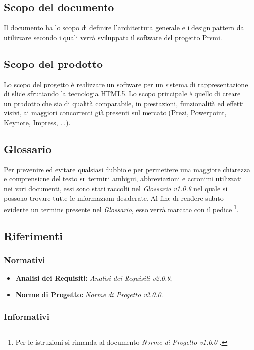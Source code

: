 \subsection{Scopo del documento}
	Il documento ha lo scopo di definire l'architettura generale e i \gls{design pattern} da utilizzare secondo i quali verrà sviluppato il software del progetto Premi.
	
\subsection{Scopo del prodotto}
Lo scopo del progetto è realizzare un software per un sistema di rappresentazione di \gls{slide} sfruttando la tecnologia  \gls{HTML5}. Lo scopo principale è quello di creare un prodotto che sia di qualità comparabile, in prestazioni, funzionalità ed effetti visivi, ai maggiori concorrenti già presenti sul mercato (Prezi, Powerpoint, Keynote, Impress, ...).

\subsection{Glossario}
Per prevenire ed evitare qualsiasi dubbio e per permettere una maggiore chiarezza e comprensione del testo su termini ambigui, abbreviazioni e acronimi utilizzati nei vari documenti, essi sono stati raccolti nel \textit{Glossario v1.0.0} nel quale si possono trovare tutte le informazioni desiderate.
Al fine di rendere subito evidente un termine presente nel \textit{Glossario}, esso verrà marcato con il pedice \G\footnote{Per le istruzioni si rimanda al documento \textit{Norme di Progetto v1.0.0} .}.

\subsection{Riferimenti}

\subsubsection{Normativi}
	\begin{itemize}
		\item \textbf{Analisi dei Requisiti:} \textit{Analisi dei Requisiti v2.0.0};
		\item \textbf{Norme di Progetto:} \textit{Norme di Progetto v2.0.0}.
	\end{itemize}
	
\subsubsection{Informativi}
